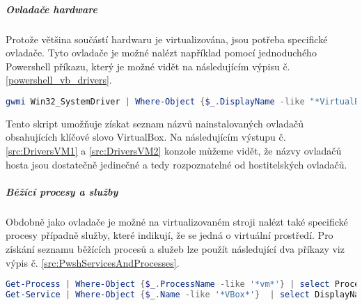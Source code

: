 \subparagraph*{Ovladače hardware}

Protože většina součástí hardwaru je virtualizována, jsou potřeba specifické ovladače. Tyto ovladače je možné nalézt například pomocí jednoduchého Powershell příkazu, který je možné vidět na následujícím výpisu č. \ref{powershell_vb_drivers}.

\noindent
\begin{minipage}[t]{1\textwidth}
    \begin{lstlisting}[language=Powershell,label=powershell_vb_drivers,basicstyle=\footnotesize,caption={Powershell kód pro získání instalovaných ovladačů VirtualBoxu}]
gwmi Win32_SystemDriver | Where-Object {$_.DisplayName -like "*VirtualBox*"} | select DisplayName
    \end{lstlisting}
\end{minipage}

Tento skript umožňuje získat seznam názvů nainstalovaných ovladačů obsahujících klíčové slovo VirtualBox. Na následujícím výstupu č. \ref{src:DriversVM1} a \ref{src:DriversVM2} konzole můžeme vidět, že názvy ovladačů hosta jsou dostatečně jedinečné a tedy rozpoznatelné od hostitelských ovladačů.

\noindent
\begin{minipage}[t]{.475\textwidth}
    
\end{minipage}
\hfill
\begin{minipage}[t]{.475\textwidth}
    
\end{minipage}


\subparagraph*{Běžící procesy a služby}

Obdobně jako ovladače je možné na virtualizovaném stroji  nalézt také specifické procesy případně služby, které indikují, že se jedná o virtuální prostředí. Pro získání seznamu běžících procesů a služeb lze použít následující dva příkazy viz výpis č. \ref{src:PwshServicesAndProcesses}.

\noindent
\begin{minipage}[t]{1\textwidth}
    \begin{lstlisting}[language=Powershell,label=src:PwshServicesAndProcesses,basicstyle=\footnotesize,caption={Powershell kód pro získání běžících procesů a služeb}]
Get-Process | Where-Object {$_.ProcessName -like '*vm*'} | select ProcessName
Get-Service | Where-Object {$_.Name -like '*VBox*'}  | select DisplayName
    \end{lstlisting}
\end{minipage}

